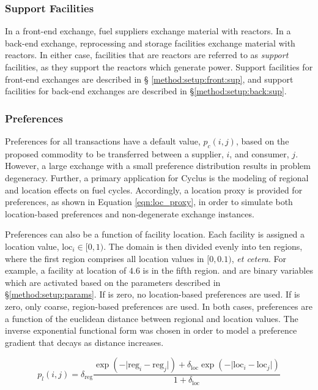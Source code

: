 \subsubsection{Support Facilities}

In a front-end exchange, fuel suppliers exchange material with reactors. In a
back-end exchange, reprocessing and storage facilities exchange material with
reactors. In either case, facilities that are  reactors are referred
to as \textit{support} facilities, as they support the reactors which generate
power. Support facilities for front-end exchanges are described in \S
\ref{method:setup:front:sup}, and support facilities for back-end exchanges are
described in \S \ref{method:setup:back:sup}.

\subsubsection{Preferences}\label{method:setup:features:prefs}

Preferences for all transactions have a default value, $p_{c}(i, j)$, based on
the proposed commodity to be transferred between a supplier, $i$, and consumer,
$j$. However, a large exchange with a small preference distribution results in
problem degeneracy. Further, a primary application for Cyclus is the modeling of
regional and location effects on fuel cycles. Accordingly, a location proxy is
provided for preferences, as shown in Equation \ref{eqn:loc_proxy}, in order to
simulate both location-based preferences and non-degenerate exchange instances.

Preferences can also be a function of facility location. Each facility is
assigned a location value, $\text{loc}_i \in [0, 1)$. The domain is then
  divided evenly into ten regions, where the first region comprises all location
  values in $[0, 0.1)$, \textit{et cetera}. For example, a facility at location
    of $4.6$ is in the fifth region. \dreg and
    \dloc are binary variables which are activated based on the
    parameters described in \S \ref{method:setup:params}. If
    \dreg is zero, no location-based preferences are used. If
    \dloc is zero, only coarse, region-based preferences are
    used. In both cases, preferences are a function of the euclidean distance
    between regional and location values. The inverse exponential functional
    form was chosen in order to model a preference gradient that decays as
    distance increases.

\begin{equation}\label{eqn:loc_proxy}
p_{l}(i, j) = \delta_{\text{reg}} 
\frac{\exp(- \lvert \text{reg}_{i} - \text{reg}_{j} \rvert ) + \delta_{\text{loc}}
  \exp(- \lvert \text{loc}_{i} - \text{loc}_{j} \rvert )}
     {1 + \delta_{\text{loc}}}
\end{equation}


